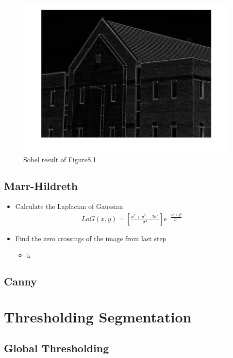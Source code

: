 \documentclass[11pt,oneside]{book}
\begin{document}
\begin{figure}[!htb]
   \centering  
   \includegraphics[width=1\textwidth]{images/9/sobel.jpg}
   \caption{Sobel result of Figure8.1}
\end{figure}

\subsection{Marr-Hildreth}
\begin{itemize}
\item Calculate the Laplacian of Gaussian
\begin{align}
  LoG(x,y) = [\frac{x^2+y^2-2\sigma ^2}{\sigma ^4}]e^{-\frac{x^2+y^2}{2\sigma ^2}}
\end{align}
\item Find the zero crossings of the image from last step
  \begin{itemize}
    \item k
    
  \end{itemize}
\end{itemize}

\subsection{Canny}

\section{Thresholding Segmentation}
\subsection{Global Thresholding}
\end{document}
